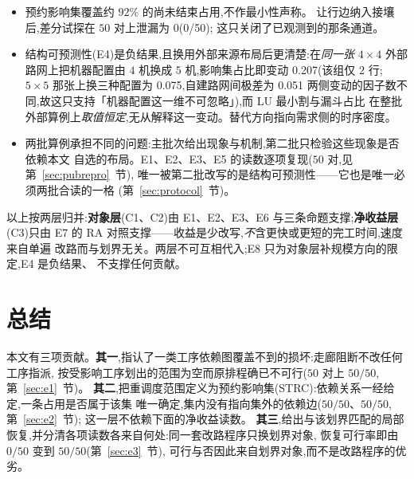 \documentclass[manuscript,screen,review]{acmart}
\providecommand{\STRC}{\textsc{STRC}}
\newcommand{\NPairs}{50}
\newcommand{\PassMiss}{\NPairs/\NPairs}      %
\newcommand{\FeasRone}{0/\NPairs}            %
\newcommand{\FeasRtwo}{\NPairs/\NPairs}      %
\newcommand{\PassClosed}{\NPairs/\NPairs}    %
\newcommand{\PassInvar}{\NPairs/\NPairs}     %
\newcommand{\ClosureAliveFrac}{92\%}
\newcommand{\NPubPairs}{50}
\newcommand{\PubCloSpread}{0.207}
\newcommand{\PubCloSpreadBig}{0.075}
\newcommand{\SelfCloSpread}{0.051}
\newcommand{\ScaleCloLo}{0.48}       %
\newcommand{\ScaleCloHi}{0.56}       %
\newcommand{\ScaleAliveShare}{0.61}  %
\newcommand{\ScaleCloAliveLo}{0.78}  %
\newcommand{\ScaleCloAliveHi}{0.91}  %
\newcommand{\ScaleMsHi}{10.4}        %
\newcommand{\ScaleRatioLo}{1.5}      %
\newcommand{\ScaleRatioHi}{3.3}      %
\newcommand{\ProbeLeakPairs}{0/50}
\newcommand{\ProbeLeaks}{0}
\begin{document}
\begin{itemize}[leftmargin=1.5em,itemsep=0.25em]
在 \ScaleCloLo--\ScaleCloHi 间波动而不单调(该比的可达上界约 \ScaleAliveShare;
以可改写集合为分母则为 \ScaleCloAliveLo--\ScaleCloAliveHi,即有界性未随规模恶化,
但绝对量并不宽裕),算法耗时增长快于占用总数
升至 \ScaleMsHi\,ms,与重解码的耗时比由 \ScaleRatioLo\(\times\) 升到 \ScaleRatioHi\(\times\)
(端点在升,但逐档\emph{并不单调},见第~\ref{sec:instscale}~节)。
这是一段区间内的读数,不是渐近主张。
\item 预约影响集覆盖约 \(\ClosureAliveFrac\) 的尚未结束占用,不作最小性声称。
让行边纳入接壤后,差分试探在 \(\NPairs\) 对上泄漏为 \ProbeLeaks(\ProbeLeakPairs);
这只关闭了已观测到的那条通道。
\item 结构可预测性(E4)是负结果,且换用外部来源布局后更清楚:在\emph{同一张} \(4\times 4\)
外部路网上把机器配置由 \(4\) 机换成 \(5\) 机,影响集占比即变动 \PubCloSpread(该组仅 \(2\) 行;
\(5\times 5\) 那张上换三种配置为 \PubCloSpreadBig,自建路网间极差为 \SelfCloSpread\;
两侧变动的因子数不同,故这只支持「机器配置这一维不可忽略」),而 LU 最小割与漏斗占比
在整批外部算例上\emph{取值恒定},无从解释这一变动。替代方向指向需求侧的时序密度。
\item 两批算例承担不同的问题:主批次给出现象与机制,第二批只检验这些现象是否依赖本文
自选的布局。E1、E2、E3、E5 的读数逐项复现(\(\NPubPairs\) 对,见第~\ref{sec:pubrepro}~节),
唯一被第二批改写的是结构可预测性——它也是唯一必须两批合读的一格
(第~\ref{sec:protocol}~节)。
\end{itemize}

以上按两层归并:\textbf{对象层}(C1、C2)由 E1、E2、E3、E6 与三条命题支撑;\textbf{净收益层}
(C3)只由 E7 的 RA 对照支撑——收益是少改写,\emph{不}含更快或更短的完工时间,速度来自单遍
改路而与划界无关。两层不可互相代入;E8 只为对象层补规模方向的限定,E4 是负结果、
不支撑任何贡献。


\section{总结}
\label{sec:conclusion}

本文有三项贡献。\textbf{其一},指认了一类工序依赖图覆盖不到的损坏:走廊阻断不改任何工序指派,
按受影响工序划出的范围为空而原排程确已不可行(\(\NPairs\) 对上 \(\PassMiss\),第~\ref{sec:e1}~节)。
\textbf{其二},把重调度范围定义为预约影响集(\STRC):依赖关系一经给定,一条占用是否属于该集
唯一确定,集内没有指向集外的依赖边(\(\PassClosed\)、\(\PassInvar\),第~\ref{sec:e2}~节);
这一层不依赖下面的净收益读数。
\textbf{其三},给出与该划界匹配的局部恢复,并分清各项读数各来自何处:同一套改路程序只换划界对象,
恢复可行率即由 \(\FeasRone\) 变到 \(\FeasRtwo\)(第~\ref{sec:e3}~节),
可行与否因此来自划界对象,而不是改路程序的优劣。
\end{document}
